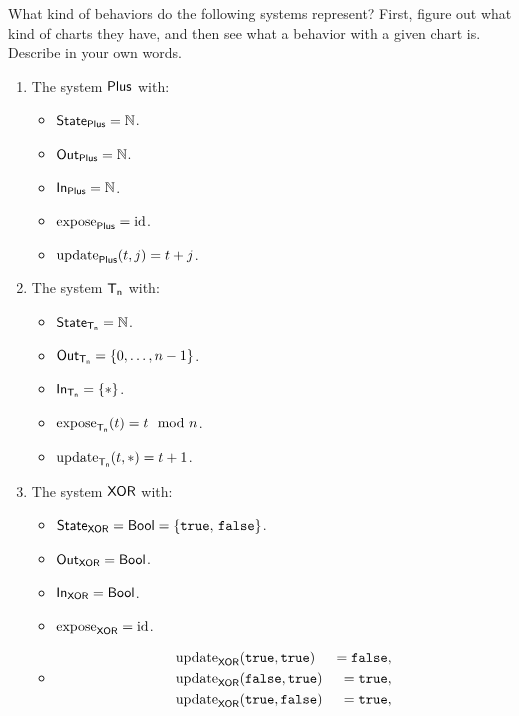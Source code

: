 \documentclass[DynamicalBook]{subfiles}
\begin{document}
{\begin{exercise}\label{ex.represents_what_discrete}
  What kind of behaviors do the following systems represent? First, figure out
  what kind of charts they have, and then see what a behavior with a given chart
  is. Describe in your own words.

  \begin{enumerate}
  \item The system $\mathsf{Plus}$ with:
    \begin{itemize}
    \item $\mathsf{State}_{\mathsf{Plus}} = \mathbb{N}$.
    \item $\mathsf{Out}_{\mathsf{Plus}} = \mathbb{N}$.
    \item $\mathsf{In}_{\mathsf{Plus}} = \mathbb{N}$.
    \item $\mathrm{expose}_{\mathsf{Plus}} = \mathrm{id}$.
    \item $\mathrm{update}_{\mathsf{Plus}}(t, j) = t + j$.
    \end{itemize}
  \item The system $\mathsf{T_n}$ with:
    \begin{itemize}
    \item $\mathsf{State}_{\mathsf{T_n}} = \mathbb{N}$.
    \item $\mathsf{Out}_{\mathsf{T_n}} = \{0, \ldots, n - 1\}$.
    \item $\mathsf{In}_{\mathsf{T_n}} = \{\ast\}$.
    \item $\mathrm{expose}_{\mathsf{T_n}}(t) = t \mod n$.
    \item $\mathrm{update}_{\mathsf{T_n}}(t, \ast) = t + 1$.
    \end{itemize}
  \item The system $\mathsf{XOR}$ with:
    \begin{itemize}
    \item $\mathsf{State}_{\mathsf{XOR}} = \mathsf{Bool} = \{\mathtt{true},\, \mathtt{false}\}$.
    \item $\mathsf{Out}_{\mathsf{XOR}} = \mathsf{Bool}$.
    \item $\mathsf{In}_{\mathsf{XOR}} = \mathsf{Bool}$.
    \item $\mathrm{expose}_{\mathsf{XOR}} = \mathrm{id}$.
    \item \[\begin{aligned}
        &\update{XOR}(\true, \true) &= \false, \\
        &\update{XOR}(\false, \true) &= \true, \\
        &\update{XOR}(\true, \false) &= \true, \\

\end{aligned}\]
\end{itemize}
\end{enumerate}
\end{exercise}}
\end{document}
